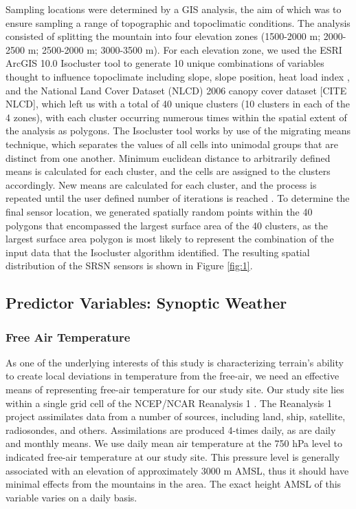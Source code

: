 \documentclass{ametsoc}
\begin{document}
Sampling locations were determined
by a GIS analysis, the aim of which was to ensure sampling a range of
topographic and topoclimatic conditions.  The analysis consisted of splitting
the mountain into four elevation zones (1500-2000 m; 2000-2500 m; 2500-2000 m;
3000-3500 m).  For each elevation zone, we used the ESRI ArcGIS 10.0 Isocluster
tool to generate 10 unique combinations of variables thought to influence
topoclimate including slope, slope position, heat load index \citep{McCune2002},
and the National Land Cover Dataset (NLCD) 2006 canopy cover dataset [CITE
NLCD], which left us with a total of 40 unique clusters (10 clusters in each of
the 4 zones), with each cluster occurring numerous times  within the spatial
extent of the analysis as polygons. The Isocluster tool works by use of the
migrating means technique, which separates the values of all cells into unimodal
groups that are distinct from one another. Minimum euclidean distance to
arbitrarily defined means is calculated for each cluster, and the cells are
assigned to the clusters accordingly. New means are calculated for each cluster,
and the process is repeated until the user defined number of iterations is
reached \citep{ESRI2015}.  To determine the final sensor location, we
generated spatially random points within the 40 polygons that encompassed the
largest surface area of the 40 clusters, as the largest surface area polygon is
most likely to represent the combination of the input data that the Isocluster
algorithm identified.   The resulting spatial distribution of the SRSN sensors
is shown in Figure \ref{fig:1}.

\subsection{Predictor Variables: Synoptic Weather} 
\subsubsection{Free Air Temperature} 
As one of the
underlying interests of this study is characterizing terrain's ability to create
local deviations in temperature from the free-air, we need an effective means of
representing free-air temperature for our study site.  Our study site lies
within a single grid cell of the NCEP/NCAR Reanalysis 1 \citep{Kalnay1996}.  The
Reanalysis 1 project assimilates data from a number of sources, including land,
ship, satellite, radiosondes, and others.  Assimilations are produced 4-times
daily, as are daily and monthly means.  We use daily mean air temperature at the
750 hPa level to indicated free-air temperature at our study site.  This
pressure level is generally associated with an elevation of approximately 3000 m
AMSL, thus it should have minimal effects from the mountains in the area.  The
exact height AMSL of this variable varies on a daily basis.
\end{document}

